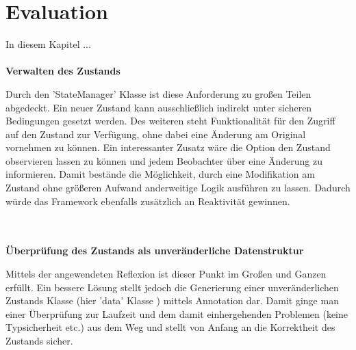 \section{Evaluation}
\label{sec:evaluation}
In diesem Kapitel ...
\\\\

\textbf{Verwalten des Zustands}
\bigskip
\begin{addmargin}[1em]{0em}
	Durch den 'StateManager' Klasse ist diese Anforderung zu großen Teilen abgedeckt. Ein neuer Zustand kann ausschließlich indirekt unter sicheren Bedingungen gesetzt werden. Des weiteren steht Funktionalität für den Zugriff auf den Zustand zur Verfügung, ohne dabei eine Änderung am Original vornehmen zu können. Ein interessanter Zusatz wäre die Option den Zustand observieren lassen zu können und jedem Beobachter über eine Änderung zu informieren. Damit bestände die Möglichkeit, durch eine Modifikation am Zustand ohne größeren Aufwand anderweitige Logik ausführen zu lassen. Dadurch würde das Framework ebenfalls zusätzlich an Reaktivität gewinnen.  
\end{addmargin}
\\\\

\textbf{Überprüfung des Zustands als unveränderliche Datenstruktur}
\bigskip
\begin{addmargin}[1em]{0em}
	Mittels der angewendeten Reflexion ist dieser Punkt im Großen und Ganzen erfüllt. Ein bessere Lösung stellt jedoch die Generierung einer unveränderlichen Zustands Klasse (hier 'data' Klasse ) mittels Annotation dar. Damit ginge man einer Überprüfung zur Laufzeit und dem damit einhergehenden Problemen (keine Typsicherheit etc.) aus dem Weg und stellt von Anfang an die Korrektheit des Zustands sicher. 
\end{addmargin}
\\\\

